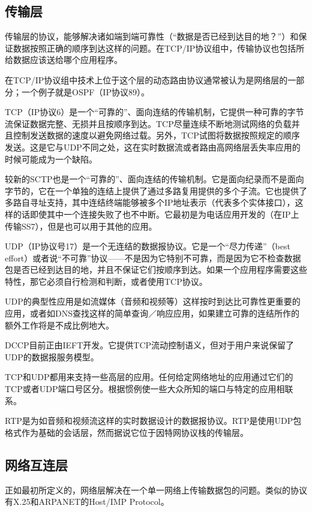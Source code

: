 \subsection{传输层}

传输层的协议，能够解决诸如端到端可靠性（“数据是否已经到达目的地？”）和保证数据按照正确的顺序到达这样的问题。在TCP/IP协议组中，传输协议也包括所给数据应该送给哪个应用程序。

在TCP/IP协议组中技术上位于这个层的动态路由协议通常被认为是网络层的一部分；一个例子就是OSPF（IP协议89）。

TCP（IP协议6）是一个“可靠的”、面向连结的传输机制，它提供一种可靠的字节流保证数据完整、无损并且按顺序到达。TCP尽量连续不断地测试网络的负载并且控制发送数据的速度以避免网络过载。另外，TCP试图将数据按照规定的顺序发送。这是它与UDP不同之处，这在实时数据流或者路由高网络层丢失率应用的时候可能成为一个缺陷。

较新的SCTP也是一个“可靠的”、面向连结的传输机制。它是面向纪录而不是面向字节的，它在一个单独的连结上提供了通过多路复用提供的多个子流。它也提供了多路自寻址支持，其中连结终端能够被多个IP地址表示（代表多个实体接口），这样的话即使其中一个连接失败了也不中断。它最初是为电话应用开发的（在IP上传输SS7），但是也可以用于其他的应用。

UDP（IP协议号17）是一个无连结的数据报协议。它是一个“尽力传递”（best effort）或者说“不可靠”协议——不是因为它特别不可靠，而是因为它不检查数据包是否已经到达目的地，并且不保证它们按顺序到达。如果一个应用程序需要这些特性，那它必须自行检测和判断，或者使用TCP协议。

UDP的典型性应用是如流媒体（音频和视频等）这样按时到达比可靠性更重要的应用，或者如DNS查找这样的简单查询／响应应用，如果建立可靠的连结所作的额外工作将是不成比例地大。

DCCP目前正由IEFT开发。它提供TCP流动控制语义，但对于用户来说保留了UDP的数据报服务模型。

TCP和UDP都用来支持一些高层的应用。任何给定网络地址的应用通过它们的TCP或者UDP端口号区分。根据惯例使一些大众所知的端口与特定的应用相联系。

RTP是为如音频和视频流这样的实时数据设计的数据报协议。RTP是使用UDP包格式作为基础的会话层，然而据说它位于因特网协议栈的传输层。




\subsection{网络互连层}

正如最初所定义的，网络层解决在一个单一网络上传输数据包的问题。类似的协议有X.25和ARPANET的Host/IMP Protocol。

